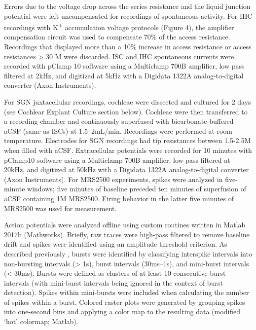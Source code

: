 \documentclass[9pt,lineno]{elife}
\begin{document}
Errors due to the voltage drop across the series resistance and the liquid junction potential were left uncompensated for recordings of spontaneous activity. For IHC recordings with K\textsuperscript{+} accumulation voltage protocols (Figure 4), the amplifier compensation circuit was used to compensate 70\% of the access resistance. Recordings that displayed more than a 10\% increase in access resistance or access resistances > 30 M\textohm \hspace{0.5mm} were discarded. ISC and IHC spontaneous currents were recorded with pClamp 10 software using a Multiclamp 700B amplifier, low pass filtered at 2kHz, and digitized at 5kHz with a Digidata 1322A analog-to-digital converter (Axon Instruments).

For SGN juxtacellular recordings, cochleae were dissected and cultured for 2 days (see Cochlear Explant Culture section below). Cochleae were then transferred to a recording chamber and continuously superfused with bicarbonate-buffered aCSF (same as ISCs) at 1.5–2mL/min. Recordings were performed at room temperature. Electrodes for SGN recordings had tip resistances between 1.5-2.5M\textohm \hspace{0.5mm} when filled with aCSF. Extracellular potentials were recorded for 10 minutes with pClamp10 software using a Multiclamp 700B amplifier, low pass filtered at 20kHz, and digitized at 50kHz with a Digidata 1322A analog-to-digital converter (Axon Instruments). For MRS2500 experiments, spikes were analyzed in five-minute windows; five minutes of baseline preceded ten minutes of superfusion of aCSF containing 1\textmu M MRS2500. Firing behavior in the latter five minutes of MRS2500 was used for measurement.

Action potentials were analyzed offline using custom routines written in Matlab 2017b (Mathworks). Briefly, raw traces were high-pass filtered to remove baseline drift and spikes were identified using an amplitude threshold criterion. As described previously \citep{Tritsch2010a}, bursts were identified by classifying interspike intervals into non-bursting intervals (> 1s), burst intervals (30ms--1s), and mini-burst intervals (< 30ms). Bursts were defined as clusters of at least 10 consecutive burst intervals (with mini-burst intervals being ignored in the context of burst detection). Spikes within mini-bursts were included when calculating the number of spikes within a burst. Colored raster plots were generated by grouping spikes into one-second bins and applying a color map to the resulting data (modified ‘hot’ colormap; Matlab).
\end{document}
